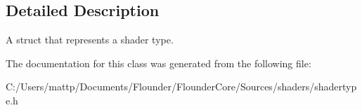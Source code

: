 \subsection{Detailed Description}
A struct that represents a shader type. 



The documentation for this class was generated from the following file\+:\begin{DoxyCompactItemize}
\item 
C\+:/\+Users/mattp/\+Documents/\+Flounder/\+Flounder\+Core/\+Sources/shaders/shadertype.\+h\end{DoxyCompactItemize}
